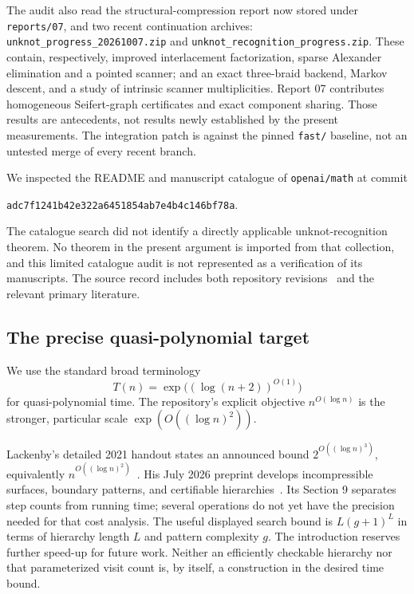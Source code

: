 The audit also read the structural-compression report now stored under
\texttt{reports/07}, and two recent continuation archives:
\nolinkurl{unknot_progress_20261007.zip} and
\nolinkurl{unknot_recognition_progress.zip}. These contain, respectively,
improved interlacement factorization, sparse Alexander elimination and a
pointed scanner; and an exact three-braid backend, Markov descent, and a
study of intrinsic scanner multiplicities. Report 07 contributes
homogeneous Seifert-graph certificates and exact component sharing. Those
results are antecedents, not results newly established by the present
measurements. The integration patch is against the pinned \texttt{fast/}
baseline, not an untested merge of every recent branch.

We inspected the README and manuscript catalogue of
\texttt{openai/math} at commit
\begin{center}
\texttt{adc7f1241b42e322a6451854ab7e4b4c146bf78a}.
\end{center}
The catalogue search did
not identify a directly applicable unknot-recognition theorem. No theorem
in the present argument is imported from that collection, and this limited
catalogue audit is not represented as a verification of its manuscripts.
The source record includes both repository revisions~\cite{proveit,openai}
and the relevant
primary literature.

\subsection{The precise quasi-polynomial target}

We use the standard broad terminology
\[
 T(n)=\exp\bigl((\log(n+2))^{O(1)}\bigr)
\]
for quasi-polynomial time. The repository's explicit objective
$n^{O(\log n)}$ is the stronger, particular scale
$\exp(O((\log n)^2))$.

Lackenby's detailed 2021 handout states an announced bound
$2^{O((\log n)^3)}$, equivalently $n^{O((\log n)^2)}$~\cite{lackenbytalk}.
His July 2026 preprint develops incompressible surfaces, boundary patterns,
and certifiable hierarchies~\cite{lackenby2026}. Its Section 9 separates
step counts from running time; several operations do not yet have the
precision needed for that cost analysis. The useful displayed search bound
is $L(g+1)^L$ in terms of hierarchy length $L$ and pattern complexity $g$.
The introduction reserves further speed-up for future work. Neither an
efficiently checkable hierarchy nor that parameterized visit count is, by
itself, a construction in the desired time bound.

